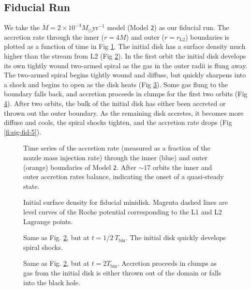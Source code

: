 \documentclass{emulateapj}
\newcommand{\model}[1]{{Model \texttt{#1}}}
\begin{document}
\subsection{Fiducial Run}
\label{subsec:fiducial}

We take the $\dot{M} = 2 \times 10^{-3} M_\odot \text{yr}^{-1}$ model (\model{2}) as our fiducial run.  The accretion rate through the inner ($r=4 M$) and outer ($r=r_\text{L2}$) boundaries is plotted as a function of time in Fig \ref{fi:mdot-fid}. The initial disk has a surface density much higher than the stream from L2 (Fig \ref{fi:sig-fid-0}).  In the first orbit the initial disk develops its own tightly wound two-armed spiral as the gas in the outer radii is flung away.  The two-armed spiral begins tightly wound and diffuse, but quickly sharpens into a shock and begins to open as the disk heats (Fig \ref{fi:sig-fid-05}).  Some gas flung to the boundary falls back, and accretion proceeds in clumps for the first two orbits (Fig \ref{fi:sig-fid-2}).  After two orbits, the bulk of the initial disk has either been accreted or thrown out the outer boundary.  As the remaining disk accretes, it becomes more diffuse and cools, the spiral shocks tighten, and the accretion rate drops (Fig \ref{fi:sig-fid-5}).

\begin{figure}
\caption{\label{fi:mdot-fid} Time series of the accretion rate (measured as a fraction of the nozzle mass injection rate) through the inner (blue) and outer (orange) boundaries of \model{2}.  After $\sim17$ orbits the inner and outer accretion rates balance, indicating the onset of a quasi-steady state.}
\end{figure}

\begin{figure}
\caption{\label{fi:sig-fid-0} Initial surface density for fiducial minidisk.  Magenta dashed lines are level curves of the Roche potential corresponding to the L1 and L2 Lagrange points.}
\end{figure}

\begin{figure}
\caption{\label{fi:sig-fid-05} Same as Fig. \ref{fi:sig-fid-0}, but at $t = 1/2\ T_\text{bin}$.  The initial disk quickly develops spiral shocks.}
\end{figure}

\begin{figure}
\caption{\label{fi:sig-fid-2} Same as Fig. \ref{fi:sig-fid-0}, but at $t = 2 T_\text{bin}$.  Accretion proceeds in clumps as gas from the initial disk is either thrown out of the domain or falls into the black hole.}
\end{figure}
\end{document}
